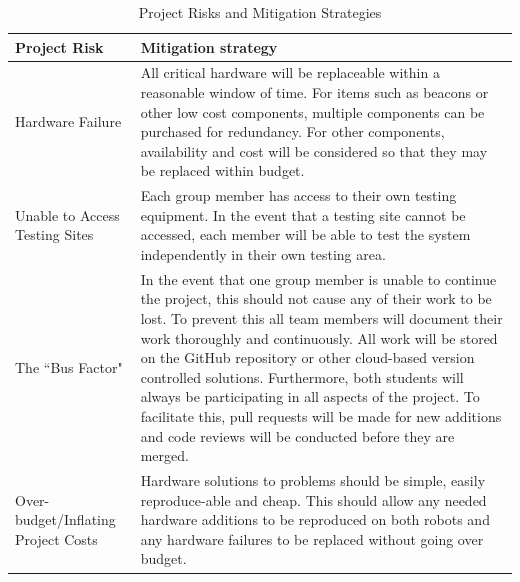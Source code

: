 \documentclass[12pt]{report}
\begin{document}
\begin{table}[H]
\centering
    \caption{Project Risks and Mitigation Strategies}

    \begin{tabular}{  l  p{8cm}}
        \toprule
\textbf{Project Risk}      
& \textbf{Mitigation strategy} 
\\\hline
Hardware Failure 
& All critical hardware will be replaceable within a reasonable window of time. For items such as beacons or other low cost components, multiple components can be purchased for redundancy. For other components, availability and cost will be considered so that they may be replaced within budget. 
\\\hline
Unable to Access Testing Sites 
& Each group member has access to their own testing equipment. In the event that a testing site cannot be accessed, each member will be able to test the system independently in their own testing area.
\\\hline
The ``Bus Factor"   
& In the event that one group member is unable to continue the project, this should not cause any of their work to be lost. To prevent this all team members will document their work thoroughly and continuously. All work will be stored on the GitHub repository or other cloud-based version controlled solutions. Furthermore, both students will always be participating in all aspects of the project. To facilitate this, pull requests will be made for new additions and code reviews will be conducted before they are merged.
\\\hline
Over-budget/Inflating Project Costs
& Hardware solutions to problems should be simple, easily reproduce-able and cheap. This should allow any needed hardware additions to be reproduced on both robots and any hardware failures to be replaced without going over budget.
\\
        \bottomrule
    \end{tabular}
\end{table}


\end{document}

